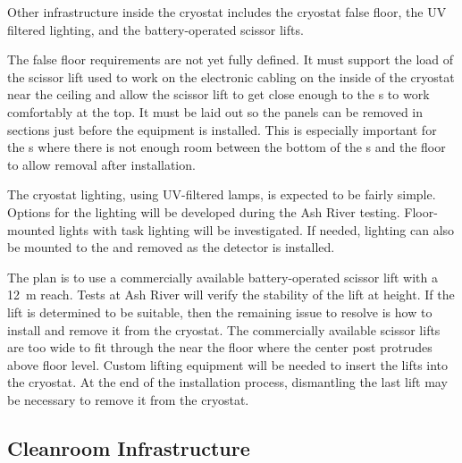 

Other infrastructure inside the cryostat includes the cryostat false floor, the UV filtered lighting, and the battery-operated scissor lifts. 

The false floor requirements are not yet fully defined.  
It must support the load of the scissor lift used to work on the electronic cabling on the inside of the cryostat near the ceiling and allow the scissor lift to get close enough to the s to work comfortably at the top. 
It  must be laid out so the panels can be removed in sections just before the equipment is installed. 
This is especially important for the s where there is not enough room between the bottom of the s and the floor to allow removal after installation. 

The cryostat lighting, using UV-filtered  lamps, is expected to be fairly simple. Options for the lighting will be developed during the Ash River testing.
Floor-mounted lights with task lighting will be investigated. If needed, lighting can also be mounted to the  and removed as the detector is installed.

The plan is to use a commercially available battery-operated scissor lift with a \SI{12}{m} reach. Tests at Ash River will verify the stability of the lift at height. If the lift is determined to be suitable, then the remaining issue to resolve is how to install and remove it from the cryostat. 
The commercially available scissor lifts are too wide to fit through the  near the floor where the center post protrudes above floor level.
Custom lifting equipment will be needed to insert the lifts into the cryostat. 
At the end of the installation process, dismantling the last lift may be necessary to remove it from the cryostat.


\subsection{Cleanroom Infrastructure}
\label{sec:fdsp-tc-infr-comm}

